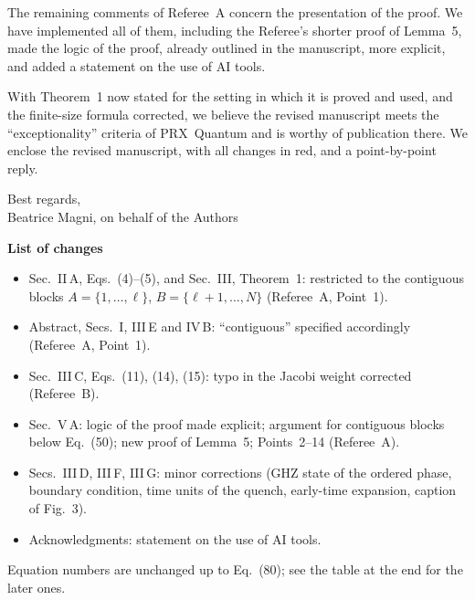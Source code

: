 \documentclass[11pt]{article}
\begin{document}
\medskip
\noindent
The remaining comments of Referee~A concern the presentation of the proof. We have implemented all of them, including the Referee's shorter proof of Lemma~5, made the logic of the proof, already outlined in the manuscript, more explicit, and added a statement on the use of AI tools.

\medskip
\noindent
With Theorem~1 now stated for the setting in which it is proved and used, and the finite-size formula corrected, we believe the revised manuscript meets the ``exceptionality'' criteria of PRX~Quantum and is worthy of publication there. We enclose the revised manuscript, with all changes in red, and a point-by-point reply.

\medskip
\noindent
Best regards,\\
Beatrice Magni, on behalf of the Authors

\newpage

\noindent\textbf{\large List of changes}

\medskip

\begin{itemize}[leftmargin=*]
\item Sec.~II\,A, Eqs.~(4)--(5), and Sec.~III, Theorem~1: restricted to the contiguous blocks $A=\{1,\dots,\ell\}$, $B=\{\ell+1,\dots,N\}$ (Referee~A, Point~1).
\item Abstract, Secs.~I, III\,E and IV\,B: ``contiguous'' specified accordingly (Referee~A, Point~1).
\item Sec.~III\,C, Eqs.~(11), (14), (15): typo in the Jacobi weight corrected (Referee~B).
\item Sec.~V\,A: logic of the proof made explicit; argument for contiguous blocks below Eq.~(50); new proof of Lemma~5; Points~2--14 (Referee~A).
\item Secs.~III\,D, III\,F, III\,G: minor corrections (GHZ state of the ordered phase, boundary condition, time units of the quench, early-time expansion, caption of Fig.~3).
\item Acknowledgments: statement on the use of AI tools.
\end{itemize}

\noindent Equation numbers are unchanged up to Eq.~(80); see the table at the end for the later ones.

\newpage

\end{document}
